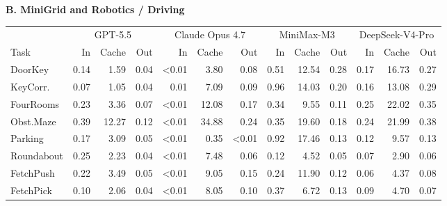 \begin{table}[t]
\begin{center}
\vspace{0.75em}
\textbf{B. MiniGrid and Robotics / Driving}\par\vspace{0.25em}
\begin{tabular}{@{}l*{4}{rrr}@{}}
\toprule
 & \multicolumn{3}{c}{GPT-5.5} & \multicolumn{3}{c}{Claude Opus 4.7}
 & \multicolumn{3}{c}{MiniMax-M3} & \multicolumn{3}{c}{DeepSeek-V4-Pro} \\
\cmidrule(lr){2-4}\cmidrule(lr){5-7}\cmidrule(lr){8-10}\cmidrule(lr){11-13}
Task & In & Cache & Out & In & Cache & Out & In & Cache & Out & In & Cache & Out \\
\midrule
DoorKey & 0.14 & 1.59 & 0.04 & \textless{}0.01 & 3.80 & 0.08 & 0.51 & 12.54 & 0.28 & 0.17 & 16.73 & 0.27 \\
KeyCorr. & 0.07 & 1.05 & 0.04 & 0.01 & 7.09 & 0.09 & 0.96 & 14.03 & 0.20 & 0.16 & 13.08 & 0.29 \\
FourRooms & 0.23 & 3.36 & 0.07 & \textless{}0.01 & 12.08 & 0.17 & 0.34 & 9.55 & 0.11 & 0.25 & 22.02 & 0.35 \\
Obst.Maze & 0.39 & 12.27 & 0.12 & \textless{}0.01 & 34.88 & 0.24 & 0.35 & 19.60 & 0.18 & 0.24 & 21.99 & 0.38 \\
Parking & 0.17 & 3.09 & 0.05 & \textless{}0.01 & 0.35 & \textless{}0.01 & 0.92 & 17.46 & 0.13 & 0.12 & 9.57 & 0.13 \\
Roundabout & 0.25 & 2.23 & 0.04 & \textless{}0.01 & 7.48 & 0.06 & 0.12 & 4.52 & 0.05 & 0.07 & 2.90 & 0.06 \\
FetchPush & 0.22 & 3.49 & 0.05 & \textless{}0.01 & 9.05 & 0.15 & 0.24 & 11.90 & 0.12 & 0.06 & 4.37 & 0.08 \\
FetchPick & 0.10 & 2.06 & 0.04 & \textless{}0.01 & 8.05 & 0.10 & 0.37 & 6.72 & 0.13 & 0.09 & 4.70 & 0.07 \\
\bottomrule
\end{tabular}
\end{center}
\end{table}
